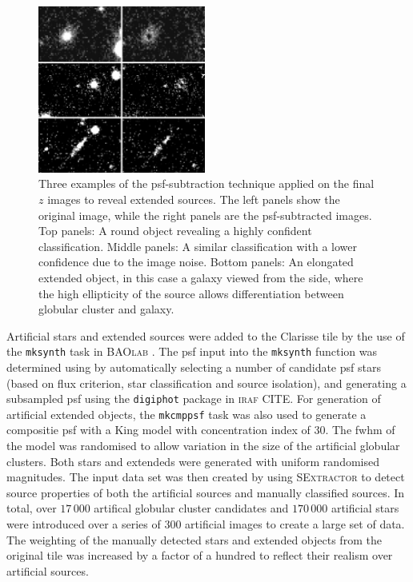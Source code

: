 \documentclass[useAMS,usenatbib]{mn2e}
\begin{document}
\begin{figure}
	\includegraphics[width=0.49\textwidth]{images/Subtracted.jpg}
	\caption{Three examples of the psf-subtraction technique applied on the
		final $z$ images to reveal extended sources. The left panels show
		the original image, while the right panels are the psf-subtracted
		images. Top panels: A round object revealing a highly confident classification. Middle panels: A similar classification with a lower confidence due to the image noise. Bottom panels: An elongated extended object, in this case a galaxy viewed from the side, where the high ellipticity of the source allows differentiation between globular cluster and galaxy.}
	\label{fig:subtraction}
\end{figure}



Artificial stars and extended sources were added to the Clarisse tile by the use of the \verb|mksynth| task in \textsc{BAOlab} \citep{Larsen1999}. The psf input into the \verb|mksynth| function was determined using by automatically selecting a number of candidate psf stars (based on flux criterion, star classification and source isolation), and generating a subsampled psf using the \verb|digiphot| package in \textsc{iraf} {\color{red} CITE}. For generation of artificial extended objects, the \verb|mkcmppsf| task was also used to generate a compositie psf with a King model \citep{King1962} with concentration index of 30. The fwhm of the model was randomised to allow variation in the size of the artificial globular clusters. Both stars and extendeds were generated with uniform randomised magnitudes. The input data set was then created by using \textsc{SExtractor} to detect source properties of both the artificial sources and manually classified sources. In total, over $17\,000$ artifical globular cluster candidates and $170\,000$ artificial stars were introduced over a series of 300 artificial images to create a large set of data. The weighting of the manually detected stars and extended objects from the original tile was increased by a factor of a hundred to reflect their realism over artificial sources.
\end{document}
